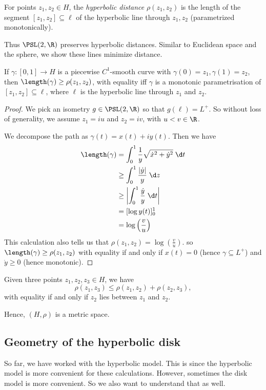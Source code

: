 \documentclass[a4paper]{article}
\begin{document}
\begin{defi}
  For points $z_1, z_2 \in H$, the \emph{hyperbolic distance} $\rho(z_1, z_2)$ is the length of the segment $[z_1, z_2] \subseteq \ell$ of the hyperbolic line through $z_1, z_2$ (parametrized monotonically).
\end{defi}
Thus $\PSL(2, \R)$ preserves hyperbolic distances. Similar to Euclidean space and the sphere, we show these lines minimize distance.

\begin{prop}
  If $\gamma: [0, 1] \to H$ is a piecewise $C^1$-smooth curve with $\gamma(0) = z_1, \gamma(1) = z_2$, then $\length(\gamma) \geq \rho(z_1, z_2)$, with equality iff $\gamma$ is a monotonic parametrisation of $[z_1, z_2] \subseteq \ell$, where $\ell$ is the hyperbolic line through $z_1$ and $z_2$.
\end{prop}

\begin{proof}
  We pick an isometry $g \in \PSL(2, \R)$ so that $g(\ell) = L^+$. So without loss of generality, we assume $z_1 = iu$ and $z_2 = iv$, with $u < v \in \R$.

  We decompose the path as $\gamma(t) = x(t) + iy(t)$. Then we have
  \begin{align*}
    \length(\gamma) &= \int_0^1 \frac{1}{y}\sqrt{\dot{x}^2 + \dot{y}^2} \;\d t \\
    &\geq \int_0^1 \frac{|\dot{y}|}{y}\;\d z\\
    &\geq \left|\int_0^1 \frac{\dot{y}}{y}\;\d t\right| \\
    &= [\log y(t)]_0^1\\
    &= \log\left(\frac{v}{u}\right)
  \end{align*}
  This calculation also tells us that $\rho(z_1, z_2) = \log\left(\frac{v}{u}\right)$. so $\length(\gamma) \geq \rho(z_1, z_2)$ with equality if and only if $x(t) = 0$ (hence $\gamma \subseteq L^+$) and $\dot{y} \geq 0$ (hence monotonic).
\end{proof}

\begin{cor}
  Given three points $z_1, z_2, z_3 \in H$, we have
  \[
    \rho(z_1, z_3) \leq \rho(z_1, z_2) + \rho(z_2, z_3),
  \]
  with equality if and only if $z_2$ lies between $z_1$ and $z_2$.
\end{cor}
Hence, $(H, \rho)$ is a metric space.

\subsection{Geometry of the hyperbolic disk}
So far, we have worked with the hyperbolic model. This is since the hyperbolic model is more convenient for these calculations. However, sometimes the disk model is more convenient. So we also want to understand that as well.
\end{document}
